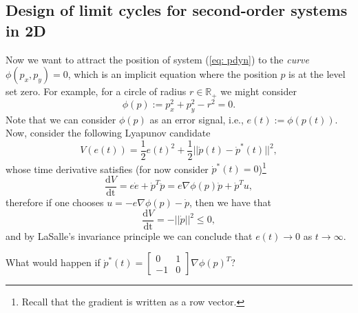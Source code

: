 \documentclass[11pt,a4paper,titlepage]{article}
\begin{document}
	\subsection{Design of limit cycles for second-order systems in 2D}
	Now we want to attract the position of system (\ref{eq: pdyn}) to the \emph{curve} $\phi(p_x, p_y) = 0$, which is an implicit equation where the position $p$ is at the level set zero. For example, for a circle of radius $r\in\mathbb{R}_+$ we might consider
	\begin{equation}
	\phi(p) := p_x^2 + p_y^2 - r^2 = 0.
	\end{equation}
	Note that we can consider $\phi(p)$ as an error signal, i.e., $e(t) := \phi(p(t))$. Now, consider the following Lyapunov candidate
\begin{equation}
	V(e(t)) = \frac{1}{2}e(t)^2 + \frac{1}{2}||\dot p(t) - \dot p^*(t)||^2,
	\label{eq: Ve2}
\end{equation}
	whose time derivative satisfies (for now consider $\dot p^*(t) = 0$)\footnote{Recall that the gradient is written as a row vector.}
	\begin{equation}
		\frac{\mathrm{d}V}{\mathrm{dt}} = e\dot e + \dot p^T\ddot p = e \nabla\phi(p)\dot p + \dot p^T u,
	\end{equation}
	therefore if one chooses $u = -e \nabla\phi(p) -\dot p$, then we have that
	\begin{equation}
\frac{\mathrm{d}V}{\mathrm{dt}} = -||\dot p||^2 \leq 0,
	\end{equation}
and by LaSalle's invariance principle we can conclude that $e(t) \to 0$ as $t\to\infty$.

What would happen if $\dot p^*(t) = \begin{bmatrix}0 & 1 \\ -1 & 0\end{bmatrix}\nabla\phi(p)^T$?
\end{document}
